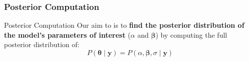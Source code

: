 \subsubsection{Posterior Computation}
\begin{frame}{Posterior Computation}
	Our aim to is to \textbf{find the posterior distribution of the
		model's parameters of interest} ($\alpha$ and $\boldsymbol{\beta}$)
	by computing the full posterior distribution of:
	$$
		P(\boldsymbol{\theta} \mid \mathbf{y}) = P(\alpha, \boldsymbol{\beta}, \sigma \mid \mathbf{y})
	$$
\end{frame}
